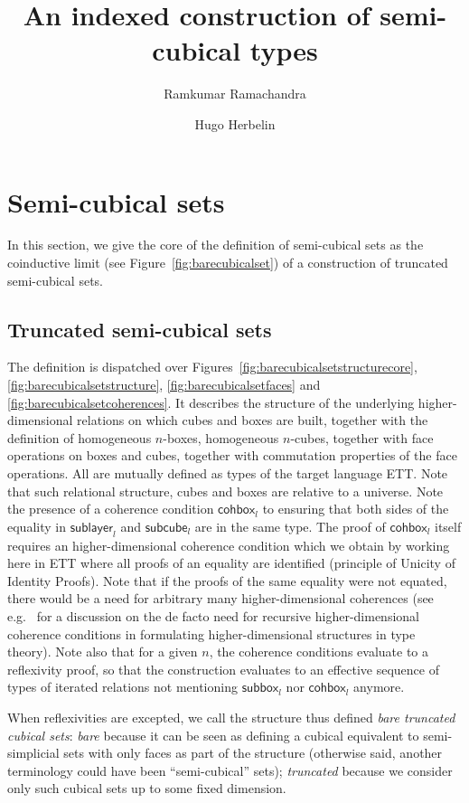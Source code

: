 \documentclass{article}
\title{An indexed construction of semi-cubical types}
\author{Ramkumar Ramachandra}
\author{Hugo Herbelin}
\newcommand{\downbox}[2]{\ensuremath{\mathsf{subbox}_{#1}^{#2}}}
\newcommand{\downlayer}[2]{\ensuremath{\mathsf{sublayer}_{#1}^{#2}}}
\newcommand{\downcube}[2]{\ensuremath{\mathsf{subcube}_{#1}^{#2}}}
\newcommand{\cohbox}[2]{\ensuremath{\mathsf{cohbox}_{{#1}}^{{#2}}}}
\begin{document}
\maketitle

\tableofcontents

\section{Semi-cubical sets}

In this section, we give the core of the definition of semi-cubical
sets as the coinductive limit (see Figure~\ref{fig:barecubicalset}) of a
construction of truncated semi-cubical sets.

\subsection{Truncated semi-cubical sets}

The definition is dispatched over Figures~\ref{fig:barecubicalsetstructurecore}, \ref{fig:barecubicalsetstructure}, \ref{fig:barecubicalsetfaces} and \ref{fig:barecubicalsetcoherences}. It describes the structure of the underlying higher-dimensional relations on which cubes and boxes are built, together with the definition of homogeneous $n$-boxes, homogeneous $n$-cubes, together with face operations on boxes and cubes, together with commutation properties of the face operations. All are mutually defined as types of the target language ETT. Note that such relational structure, cubes and boxes are relative to a universe. Note the presence of a coherence condition $\cohbox{l}{}$ to ensuring that both sides of the equality in $\downlayer{l}{}$ and $\downcube{l}{}$ are in the same type. The proof of $\cohbox{l}{}$ itself requires an higher-dimensional coherence condition which we obtain by working here in ETT where all proofs of an equality are identified (principle of Unicity of Identity Proofs). Note that if the proofs of the same equality were not equated, there would be a need for arbitrary many higher-dimensional coherences (see e.g.~\cite{Herbelin15} for a discussion on the de facto need for recursive higher-dimensional coherence conditions in formulating higher-dimensional structures in type theory). Note also that for a given $n$, the coherence conditions evaluate to a reflexivity proof, so that the construction evaluates to an effective sequence of types of iterated relations not mentioning $\downbox{l}{}$ nor $\cohbox{l}{}$ anymore.

When reflexivities are excepted, we call the structure thus defined \emph{bare truncated cubical sets}: \emph{bare} because it can be seen as defining a cubical equivalent to semi-simplicial sets with only faces as part of the structure (otherwise said, another terminology could have been ``semi-cubical'' sets); \emph{truncated} because we consider only such cubical sets up to some fixed dimension.
\end{document}
